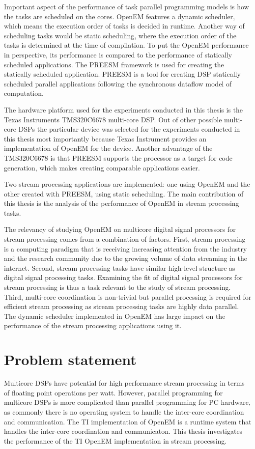 Important aspect of the performance of task parallel programming models is how the tasks are scheduled on the cores. OpenEM features a dynamic scheduler, which means the execution order of tasks is decided in runtime. Another way of scheduling tasks would be static scheduling, where the execution order of the tasks is determined at the time of compilation. To put the OpenEM performance in perspective, its performance is compared to the performance of statically scheduled applications. The PREESM framework is used for creating the statically scheduled application. PREESM is a tool for creating DSP statically scheduled parallel applications following the synchronous dataflow model of computation.

The hardware platform used for the experiments conducted in this thesis is the Texas Instruments TMS320C6678 multi-core DSP. Out of other possible multi-core DSPs the particular device was selected for the experiments conducted in this thesis most importantly because Texas Instrument provides an implementation of OpenEM for the device. Another advantage of the TMS320C6678 is that PREESM supports the processor as a target for code generation, which makes creating comparable applications easier.

Two stream processing applications are implemented: one using OpenEM and the other created with PREESM, using static scheduling. The main contribution of this thesis is the analysis of the performance of OpenEM in stream processing tasks.

The relevancy of studying OpenEM on multicore digital signal processors for stream processing comes from a combination of factors. First, stream processing is a computing paradigm that is receiving increasing attention from the industry and the research community due to the growing volume of data streaming in the internet. Second, stream processing tasks have similar high-level structure as digital signal processing tasks. Examining the fit of digital signal processors for stream processing is thus a task relevant to the study of stream processing. Third, multi-core coordination is non-trivial but parallel processing is required for efficient stream processing as stream processing tasks are highly data parallel. The dynamic scheduler implemented in OpenEM has large impact on the performance of the stream processing applications using it.

\section{Problem statement}
\label{section:problem-statement}
Multicore DSPs have potential for high performance stream processing in terms of floating point operations per watt. However, parallel programming for multicore DSPs is more complicated than parallel programming for PC hardware, as commonly there is no operating system to handle the inter-core coordination and communication. The TI implementation of OpenEM is a runtime system that handles the inter-core coordination and communicaton. This thesis investigates the performance of the TI OpenEM implementation in stream processing.

